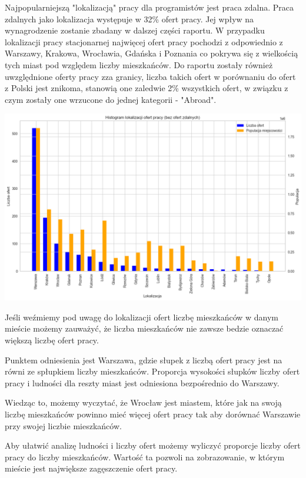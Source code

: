 \documentclass{article}
\begin{document}
Najpopularniejszą "lokalizacją" pracy dla programistów jest praca zdalna.
Praca zdalnych jako lokalizacja występuje w 32\% ofert pracy. Jej wpływ na wynagrodzenie
zostanie zbadany w dalszej części raportu.
W przypadku lokalizacji pracy stacjonarnej najwięcej ofert pracy pochodzi z odpowiednio z
Warszawy, Krakowa, Wrocławia, Gdańska i Poznania co pokrywa się z wielkością tych miast
pod względem liczby mieszkańców.
Do raportu zostały również uwzględnione oferty pracy zza granicy, liczba takich ofert
w porównaniu do ofert z Polski jest znikoma, stanowią one zaledwie 2\% wszystkich ofert,
w związku z czym zostały one wrzucone do jednej kategorii - "Abroad".

\begin{center}
    \includegraphics[scale=0.5]{img/location_with_pop.png}
\end{center}

Jeśli weźmiemy pod uwagę do lokalizacji ofert liczbę mieszkańców w danym mieście
możemy zauważyć, że liczba mieszkańców nie zawsze bedzie oznaczać większą liczbę ofert pracy.

Punktem odniesienia jest Warszawa, gdzie słupek z liczbą ofert pracy jest na równi ze spłupkiem
liczby mieszkańców.
Proporcja wysokości słupków liczby ofert pracy i ludności dla reszty miast jest odniesiona
bezpośrednio do Warszawy.

Wiedząc to, możemy wyczytać, że Wrocław jest miastem, które jak na swoją liczbę mieszkańców
powinno mieć więcej ofert pracy tak aby dorównać Warszawie przy swojej liczbie mieszkańców.

Aby ułatwić analizę ludności i liczby ofert możemy wyliczyć proporcje liczby ofert pracy do liczby mieszkańców.
Wartość ta pozwoli na zobrazowanie, w którym mieście jest największe zagęszczenie ofert pracy.
\end{document}
